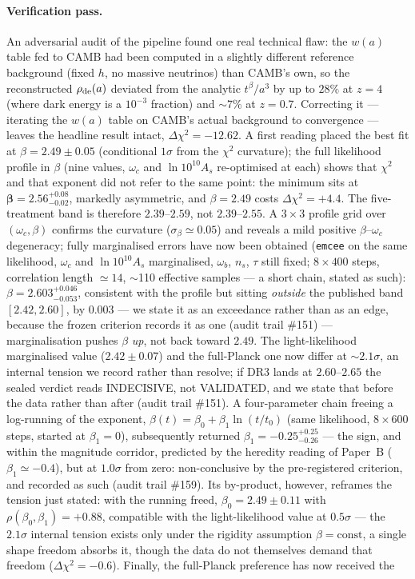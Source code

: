 \documentclass[11pt]{article}
\begin{document}
\paragraph{Verification pass.} An adversarial audit of the pipeline found one real technical flaw: the $w(a)$ table fed to CAMB had been computed in a slightly different reference background (fixed $h$, no massive neutrinos) than CAMB's own, so the reconstructed $\rho_{\rm de}(a)$ deviated from the analytic $t^{\beta}/a^{3}$ by up to $28\%$ at $z=4$ (where dark energy is a $10^{-3}$ fraction) and $\sim7\%$ at $z=0.7$. Correcting it --- iterating the $w(a)$ table on CAMB's actual background to convergence --- leaves the headline result intact, $\Delta\chi^2 = -12.62$. A first reading placed the best fit at $\beta = 2.49 \pm 0.05$ (conditional $1\sigma$ from the $\chi^2$ curvature); the full likelihood profile in $\beta$ (nine values, $\omega_c$ and $\ln 10^{10}A_s$ re-optimised at each) shows that $\chi^2$ and that exponent did not refer to the same point: the minimum sits at $\boldsymbol{\beta = 2.56^{+0.08}_{-0.02}}$, markedly asymmetric, and $\beta = 2.49$ costs $\Delta\chi^2 = +4.4$. The five-treatment band is therefore $2.39$--$2.59$, not $2.39$--$2.55$. A $3\times3$ profile grid over $(\omega_c, \beta)$ confirms the curvature ($\sigma_\beta \simeq 0.05$) and reveals a mild positive $\beta$--$\omega_c$ degeneracy; fully marginalised errors have now been obtained (\texttt{emcee} on the same likelihood, $\omega_c$ and $\ln 10^{10}A_s$ marginalised, $\omega_b$, $n_s$, $\tau$ still fixed; $8\times400$ steps, correlation length $\simeq 14$, $\sim$110 effective samples --- a short chain, stated as such): $\beta = 2.603^{+0.046}_{-0.053}$, consistent with the profile but sitting \emph{outside} the published band $[2.42, 2.60]$, by $0.003$ --- we state it as an exceedance rather than as an edge, because the frozen criterion records it as one (audit trail \#151) --- marginalisation pushes $\beta$ \emph{up}, not back toward $2.49$. The light-likelihood marginalised value ($2.42 \pm 0.07$) and the full-Planck one now differ at $\sim 2.1\sigma$, an internal tension we record rather than resolve; if DR3 lands at $2.60$--$2.65$ the sealed verdict reads INDECISIVE, not VALIDATED, and we state that before the data rather than after (audit trail \#151). A four-parameter chain freeing a log-running of the exponent, $\beta(t) = \beta_0 + \beta_1 \ln(t/t_0)$ (same likelihood, $8\times600$ steps, started at $\beta_1 = 0$), subsequently returned $\beta_1 = -0.25^{+0.25}_{-0.26}$ --- the sign, and within the magnitude corridor, predicted by the heredity reading of Paper~B ($\beta_1 \simeq -0.4$), but at $1.0\sigma$ from zero: non-conclusive by the pre-registered criterion, and recorded as such (audit trail \#159). Its by-product, however, reframes the tension just stated: with the running freed, $\beta_0 = 2.49 \pm 0.11$ with $\rho(\beta_0, \beta_1) = +0.88$, compatible with the light-likelihood value at $0.5\sigma$ --- the $2.1\sigma$ internal tension exists only under the rigidity assumption $\beta = \mathrm{const}$, a single shape freedom absorbs it, though the data do not themselves demand that freedom ($\Delta\chi^2 = -0.6$). Finally, the full-Planck preference has now received the 
\end{document}
